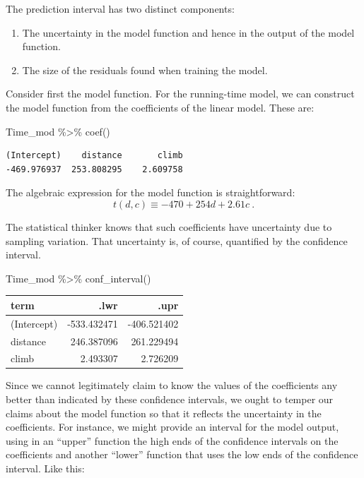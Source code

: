 \documentclass[
  letterpaper,
  DIV=11,
  numbers=noendperiod,
  oneside]{scrreprt}
\newenvironment{Shaded}{\begin{snugshade}}{\end{snugshade}}
\newcommand{\FunctionTok}[1]{\textcolor[rgb]{0.28,0.35,0.67}{#1}}
\newcommand{\NormalTok}[1]{\textcolor[rgb]{0.00,0.23,0.31}{#1}}
\newcommand{\SpecialCharTok}[1]{\textcolor[rgb]{0.37,0.37,0.37}{#1}}
\providecommand{\tightlist}{%
  \setlength{\itemsep}{0pt}\setlength{\parskip}{0pt}}\usepackage{longtable,booktabs,array}
\begin{document}
The prediction interval has two distinct components:

\begin{enumerate}
\def\labelenumi{\arabic{enumi}.}
\tightlist
\item
  The uncertainty in the model function and hence in the output of the
  model function.
\item
  The size of the residuals found when training the model.
\end{enumerate}

Consider first the model function. For the running-time model, we can
construct the model function from the coefficients of the linear model.
These are:

\begin{Shaded}
\begin{Highlighting}[]
\NormalTok{Time\_mod }\SpecialCharTok{\%\textgreater{}\%} \FunctionTok{coef}\NormalTok{()}
\end{Highlighting}
\end{Shaded}

\begin{verbatim}
(Intercept)    distance       climb 
-469.976937  253.808295    2.609758 
\end{verbatim}

The algebraic expression for the model function is straightforward:
\[t(d, c) \equiv -470 + 254 d  + 2.61 c\ .\]

The statistical thinker knows that such coefficients have uncertainty
due to sampling variation. That uncertainty is, of course, quantified by
the confidence interval.

\begin{Shaded}
\begin{Highlighting}[]
\NormalTok{Time\_mod }\SpecialCharTok{\%\textgreater{}\%} \FunctionTok{conf\_interval}\NormalTok{()}
\end{Highlighting}
\end{Shaded}

\ttfamily 
\begin{tabular}{lrr}
\toprule
term & .lwr & .upr\\
\midrule
(Intercept) & -533.432471 & -406.521402\\
distance & 246.387096 & 261.229494\\
climb & 2.493307 & 2.726209\\
\bottomrule
\end{tabular} \normalfont
\bigskip

Since we cannot legitimately claim to know the values of the
coefficients any better than indicated by these confidence intervals, we
ought to temper our claims about the model function so that it reflects
the uncertainty in the coefficients. For instance, we might provide an
interval for the model output, using in an ``upper'' function the high
ends of the confidence intervals on the coefficients and another
``lower'' function that uses the low ends of the confidence interval.
Like this:
\end{document}
